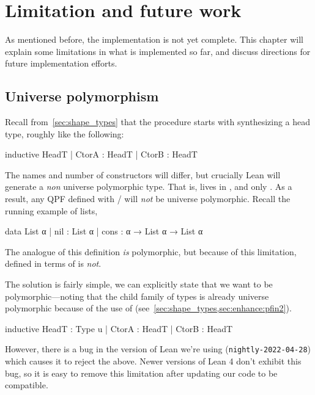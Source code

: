 
\chapter{Limitation and future work}%
\label{ch:limitations}


As mentioned before, the implementation is not yet complete.
This chapter will explain some limitations in what is implemented so far, and discuss
directions for future implementation efforts.

\section{Universe polymorphism}

Recall from~\cref{sec:shape_types} that the procedure starts with synthesizing a head type, roughly like the following:
\begin{leancode}
  inductive HeadT
    | CtorA : HeadT
    | CtorB : HeadT
\end{leancode}
The names and number of constructors will differ, but crucially Lean will generate a \emph{non} universe 
polymorphic type. That is,  lives in , and only .
As a result, any QPF defined with \data{}/\codata{} will \emph{not} be universe polymorphic.
Recall the running example of lists,
\begin{leancode}
  data List α 
    | nil  : List α
    | cons : α → List α → List α
\end{leancode}

The \inductive{} analogue of this definition \emph{is} polymorphic, but because of this limitation,
 defined in terms of \data{} is \emph{not}.
  

The solution is fairly simple, we can explicitly state that we want  to be polymorphic---noting that the child family of types is already universe polymorphic because of the use of  (see~\cref{sec:shape_types,sec:enhance:pfin2}).
\begin{badleancode}

  inductive HeadT : Type u
    | CtorA : HeadT
    | CtorB : HeadT

\end{badleancode}

However, there is a bug in the version of Lean we're using (\texttt{nightly-2022-04-28}) 
which causes it to reject the above. 
Newer versions of Lean 4 don't exhibit this bug, so it is easy to remove this limitation after updating
our code to be compatible.



